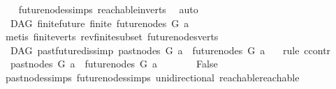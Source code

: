 \begin{isabellebody}
%
\isadelimproof
\ \ %
\endisadelimproof
%
\isatagproof
{}\isamarkupfalse%
\ future{\isacharunderscore}{\kern0pt}nodes{\isachardot}{\kern0pt}simps\ reachable{}{\isacharunderscore}{\kern0pt}in{\isacharunderscore}{\kern0pt}verts\ \isamarkupfalse%
\ auto%
\endisatagproof
{\isafoldproof}%
%
\isadelimproof
\isanewline
%
\endisadelimproof
\isanewline
{}\isamarkupfalse%
\ {\isacharparenleft}{\kern0pt}\ DAG{\isacharparenright}{\kern0pt}\ finite{\isacharunderscore}{\kern0pt}future{\isacharcolon}{\kern0pt}\ {\isachardoublequoteopen}finite\ {\isacharparenleft}{\kern0pt}future{\isacharunderscore}{\kern0pt}nodes\ G\ a{\isacharparenright}{\kern0pt}{\isachardoublequoteclose}\isanewline
%
\isadelimproof
\ \ %
\endisadelimproof
%
\isatagproof
{}\isamarkupfalse%
\ {\isacharparenleft}{\kern0pt}metis\ finite{\isacharunderscore}{\kern0pt}verts\ rev{\isacharunderscore}{\kern0pt}finite{\isacharunderscore}{\kern0pt}subset\ future{\isacharunderscore}{\kern0pt}nodes{\isacharunderscore}{\kern0pt}verts{\isacharparenright}{\kern0pt}%
\endisatagproof
{\isafoldproof}%
%
\isadelimproof
\isanewline
%
\endisadelimproof
\isanewline
{}\isamarkupfalse%
\ {\isacharparenleft}{\kern0pt}\ DAG{\isacharparenright}{\kern0pt}\ past{\isacharunderscore}{\kern0pt}future{\isacharunderscore}{\kern0pt}dis{\isacharbrackleft}{\kern0pt}simp{\isacharbrackright}{\kern0pt}{\isacharcolon}{\kern0pt}\ {\isachardoublequoteopen}past{\isacharunderscore}{\kern0pt}nodes\ G\ a\ {\isasyminter}\ future{\isacharunderscore}{\kern0pt}nodes\ G\ a\ {\isacharequal}{\kern0pt}\ {\isacharbraceleft}{\kern0pt}{\isacharbraceright}{\kern0pt}{\isachardoublequoteclose}\isanewline
%
\isadelimproof
%
\endisadelimproof
%
\isatagproof
{}\isamarkupfalse%
\ {\isacharparenleft}{\kern0pt}rule\ ccontr{\isacharparenright}{\kern0pt}\isanewline
\ \ \isamarkupfalse%
\ {\isachardoublequoteopen}{\isasymnot}\ past{\isacharunderscore}{\kern0pt}nodes\ G\ a\ {\isasyminter}\ future{\isacharunderscore}{\kern0pt}nodes\ G\ a\ {\isacharequal}{\kern0pt}\ {\isacharbraceleft}{\kern0pt}{\isacharbraceright}{\kern0pt}{\isachardoublequoteclose}\isanewline
\ \ \isamarkupfalse%
\ \isamarkupfalse%
\ False\isanewline
\ \ \ \ \isamarkupfalse%
\ past{\isacharunderscore}{\kern0pt}nodes{\isachardot}{\kern0pt}simps\ future{\isacharunderscore}{\kern0pt}nodes{\isachardot}{\kern0pt}simps\ unidirectional\ reachable{}{\isacharunderscore}{\kern0pt}reachable\ \isamarkupfalse%

\end{isabellebody}
